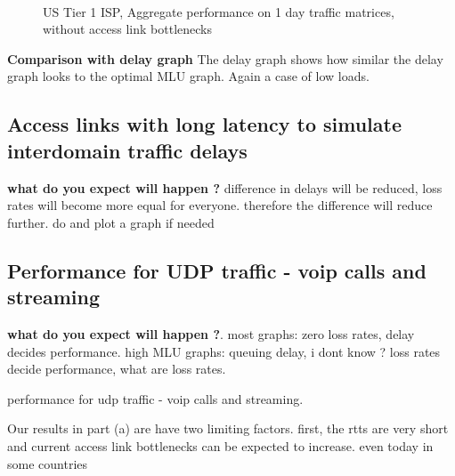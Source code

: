\documentclass[a4paper,10pt]{article}
\begin{document}
\begin{figure}[htp]
  \begin{center}
     \\
  \end{center}
  \caption{US Tier 1 ISP, Aggregate performance on 1 day traffic matrices, without access link bottlenecks}
  \label{fig:usisp_aggregate_nolimit}
\end{figure}

\textbf{Comparison with delay graph}  The delay graph shows how similar the delay graph looks to the optimal MLU graph. Again a case of low loads.

\subsection{Access links with long latency to simulate interdomain traffic delays} 

\textbf{what do you expect will happen ?} difference in delays will be reduced, loss rates will become more equal for everyone. therefore the difference will reduce further.  do and plot a graph if needed

\subsection{Performance for UDP traffic - voip calls and streaming}

\textbf{what do you expect will happen ?}. most graphs: zero loss rates, delay decides performance. high MLU graphs: queuing delay, i dont know ? loss rates decide performance, what are loss rates. 

  performance for udp traffic - voip calls and streaming. 

Our results in part (a) are have two limiting factors. first, the rtts are very short and current access link bottlenecks can be expected to increase. even today in some countries 
\end{document}
